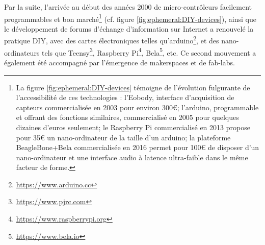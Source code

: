 \indent Par la suite, l'arrivée au début des années 2000 de micro-contrôleurs facilement programmables et bon marché\footnote{La figure \ref{fig:ephemeral:DIY-devices} témoigne de l'évolution fulgurante de l'accessibilité de ces technologies : l'Eobody, interface d'acquisition de capteurs commercialisée en 2003 pour environ 300€; l'arduino, programmable et offrant des fonctions similaires, commercialisé en 2005 pour quelques dizaines d'euros seulement; le Raspberry Pi commercialisé en 2013 propose pour 35€ un nano-ordinateur de la taille d'un arduino; la plateforme BeagleBone+Bela commercialisée en 2016 permet pour 100€ de disposer d'un nano-ordinateur et une interface audio à latence ultra-faible dans le même facteur de forme.} (cf. figure \ref{fig:ephemeral:DIY-devices}), ainsi que le développement de forums d'échange d'information sur Internet a renouvelé la pratique \gls{DIY}, avec des cartes électroniques telles qu'arduino\footnote{\url{https://www.arduino.cc}}, et des nano-ordinateurs tels que Teensy\footnote{\url{https://www.pjrc.com}}, Raspberry Pi\footnote{\url{https://www.raspberrypi.org}}, Bela\footnote{\url{https://www.bela.io}}, etc. Ce second mouvement a également été accompagné par l'émergence de \glspl{makerspace} et de \glspl{fab-lab}.
